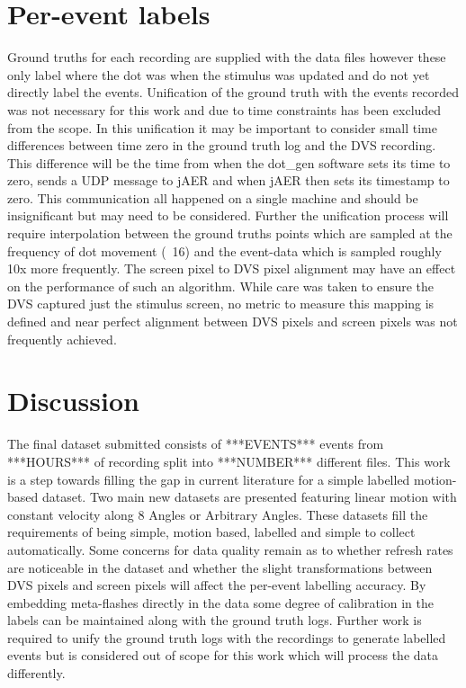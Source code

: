 \section{Per-event labels}
Ground truths for each recording are supplied with the data files however these only label where the dot was when the stimulus was updated and do not yet directly label the events.
Unification of the ground truth with the events recorded was not necessary for this work and due to time constraints has been excluded from the scope.
In this unification it may be important to consider small time differences between time zero in the ground truth log and the DVS recording.
This difference will be the time from when the dot\_gen software sets its time to zero, sends a UDP message to jAER and when jAER then sets its timestamp to zero. 
This communication all happened on a single machine and should be insignificant but may need to be considered. 
Further the unification process will require interpolation between the ground truths points which are sampled at the frequency of dot movement (~16\ms) and the event-data which is sampled roughly 10x more frequently.
The screen pixel to DVS pixel alignment may have an effect on the performance of such an algorithm. 
While care was taken to ensure the DVS captured just the stimulus screen, no metric to measure this mapping is defined and near perfect alignment between DVS pixels and screen pixels was not frequently achieved. 




\section{Discussion}
The final dataset submitted consists of ***EVENTS*** events from ***HOURS*** of recording split into ***NUMBER*** different files.
This work is a step towards filling the gap in current literature for a simple labelled motion-based dataset. 
Two main new datasets are presented featuring linear motion with constant velocity along 8 Angles or Arbitrary Angles.
These datasets fill the requirements of being simple, motion based, labelled and simple to collect automatically.
Some concerns for data quality remain as to whether refresh rates are noticeable in the dataset and whether the slight transformations between DVS pixels and screen pixels will affect the per-event labelling accuracy.
By embedding meta-flashes directly in the data some degree of calibration in the labels can be maintained along with the ground truth logs. 
Further work is required to unify the ground truth logs with the recordings to generate labelled events but is considered out of scope for this work which will process the data differently. 

